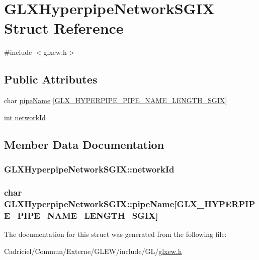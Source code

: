 \hypertarget{struct_g_l_x_hyperpipe_network_s_g_i_x}{\section{G\-L\-X\-Hyperpipe\-Network\-S\-G\-I\-X Struct Reference}
\label{struct_g_l_x_hyperpipe_network_s_g_i_x}
}


{\ttfamily \#include $<$glxew.\-h$>$}

\subsection*{Public Attributes}
\begin{DoxyCompactItemize}
\item 
char \hyperlink{struct_g_l_x_hyperpipe_network_s_g_i_x_a6338b9717fa895aec16b932f2ef693ed}{pipe\-Name} \mbox{[}\hyperlink{glxew_8h_ae1c8261c0861010d8003a31d07e26005}{G\-L\-X\-\_\-\-H\-Y\-P\-E\-R\-P\-I\-P\-E\-\_\-\-P\-I\-P\-E\-\_\-\-N\-A\-M\-E\-\_\-\-L\-E\-N\-G\-T\-H\-\_\-\-S\-G\-I\-X}\mbox{]}
\item 
\hyperlink{wglew_8h_a500a82aecba06f4550f6849b8099ca21}{int} \hyperlink{struct_g_l_x_hyperpipe_network_s_g_i_x_a81393053988b32fadb0b21615024add1}{network\-Id}
\end{DoxyCompactItemize}


\subsection{Member Data Documentation}
\hypertarget{struct_g_l_x_hyperpipe_network_s_g_i_x_a81393053988b32fadb0b21615024add1}{
\subsubsection[{network\-Id}]{ G\-L\-X\-Hyperpipe\-Network\-S\-G\-I\-X\-::network\-Id}}\label{struct_g_l_x_hyperpipe_network_s_g_i_x_a81393053988b32fadb0b21615024add1}
\hypertarget{struct_g_l_x_hyperpipe_network_s_g_i_x_a6338b9717fa895aec16b932f2ef693ed}{
\subsubsection[{pipe\-Name}]{\setlength{\rightskip}{0pt plus 5cm}char G\-L\-X\-Hyperpipe\-Network\-S\-G\-I\-X\-::pipe\-Name\mbox{[}{\bf G\-L\-X\-\_\-\-H\-Y\-P\-E\-R\-P\-I\-P\-E\-\_\-\-P\-I\-P\-E\-\_\-\-N\-A\-M\-E\-\_\-\-L\-E\-N\-G\-T\-H\-\_\-\-S\-G\-I\-X}\mbox{]}}}\label{struct_g_l_x_hyperpipe_network_s_g_i_x_a6338b9717fa895aec16b932f2ef693ed}


The documentation for this struct was generated from the following file\-:\begin{DoxyCompactItemize}
\item 
Cadriciel/\-Commun/\-Externe/\-G\-L\-E\-W/include/\-G\-L/\hyperlink{glxew_8h}{glxew.\-h}\end{DoxyCompactItemize}
